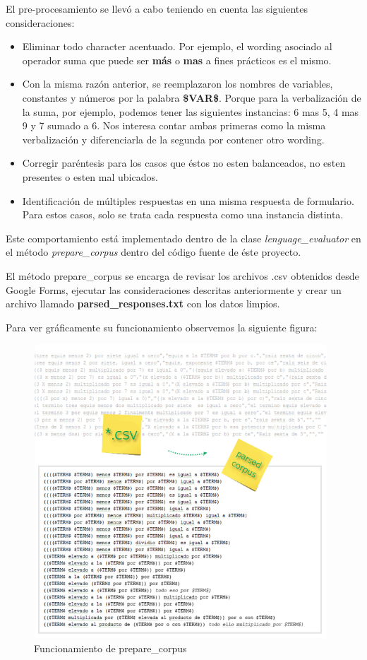 El pre-procesamiento se llevó a cabo teniendo en cuenta las siguientes consideraciones:

\begin{itemize}
   \item Eliminar todo character acentuado. Por ejemplo, el wording asociado al operador suma que puede ser \textbf{más} o \textbf{mas} a fines prácticos es el mismo.
   \item Con la misma razón anterior, se reemplazaron los nombres de variables, constantes y números por la palabra \textbf{\$VAR\$}. Porque para la verbalización de la suma, por ejemplo, podemos tener las siguientes instancias: 6 mas 5, 4 mas 9 y 7 sumado a 6. Nos interesa contar ambas primeras como la misma verbalización y diferenciarla de la segunda por contener otro wording.
   \item Corregir paréntesis para los casos que éstos no esten balanceados, no esten presentes o esten mal ubicados.
   \item Identificación de múltiples respuestas en una misma respuesta de formulario. Para estos casos, solo se trata cada respuesta como una instancia distinta.
\end{itemize}

Este comportamiento está implementado dentro de la clase \textit{lenguage\_evaluator} en el método \textit{prepare\_corpus} dentro del código fuente de éste proyecto.

El método prepare\_corpus se encarga de revisar los archivos .csv obtenidos desde Google Forms, ejecutar las consideraciones descritas anteriormente y crear un archivo llamado \textbf{parsed\_responses.txt} con los datos limpios.

Para ver gráficamente su funcionamiento observemos la siguiente figura:

\begin{figure}[H]
\centering
  \includegraphics[width=11cm, height=11cm]{Figures/parsed_corpus}
  \caption[]{Funcionamiento de prepare\_corpus}
\label{fig:parsed_corpus}
\end{figure}

